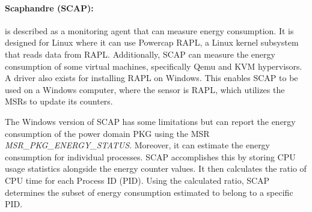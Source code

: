 \paragraph{Scaphandre (SCAP):} is described as a monitoring agent that can measure energy consumption.\cite{scaphandre} It is designed for Linux where it can use Powercap RAPL, a Linux kernel subsystem that reads data from RAPL. Additionally, SCAP can measure the energy consumption of some virtual machines, specifically Qemu and KVM hypervisors. A driver also exists for installing RAPL on Windows\cite{RAPL_Windows}. This enables SCAP to be used on a Windows computer, where the sensor is RAPL, which utilizes the MSRs to update its counters.

The Windows version of SCAP has some limitations but can report the energy consumption of the power domain PKG using the MSR \textit{MSR\_PKG\_ENERGY\_STATUS}. Moreover, it can estimate the energy consumption for individual processes. SCAP accomplishes this by storing CPU usage statistics alongside the energy counter values. It then calculates the ratio of CPU time for each Process ID (PID). Using the calculated ratio, SCAP determines the subset of energy consumption estimated to belong to a specific PID.

